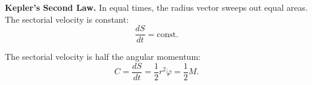 \textbf{Kepler's Second Law.} In equal times, the radius vector sweeps out equal areas. The sectorial velocity is constant:
$$\frac{dS}{dt} = \text{const}.$$

The sectorial velocity is half the angular momentum:
$$C = \frac{dS}{dt} = \frac{1}{2} r^2 \dot{\varphi} = \frac{1}{2} M.$$

